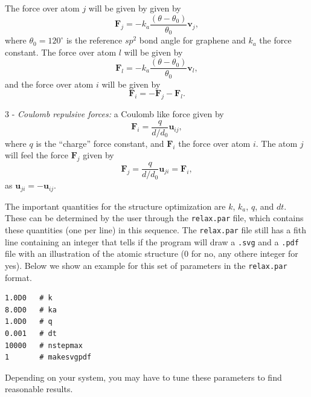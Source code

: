 \documentclass{scrreprt}
\begin{document}
The force over atom $j$ will be given by  given by
\begin{equation}
\mathbf{F}_j=-k_a\frac{(\theta-\theta_0)}{\theta_0}\mathbf{v}_j,
\end{equation}
where $\theta_0=120^\circ$ is the reference $sp^2$ bond angle for graphene and $k_a$ the force constant. The force over atom $l$ will be given by
\begin{equation}
\mathbf{F}_l=-k_a\frac{(\theta-\theta_0)}{\theta_0}\mathbf{v}_l,
\end{equation}
and the force over atom $i$ will be given by
\begin{equation}
\mathbf{F}_i=-\mathbf{F}_j-\mathbf{F}_l.
\end{equation}


3 - \emph{Coulomb repulsive forces:} a Coulomb like force given by
\begin{equation}
\mathbf{F}_i=\frac{q}{d/d_0}\mathbf{u}_{ij},
\end{equation}
where $q$ is the ``charge'' force constant, and $\mathbf{F}_i$ the force over atom $i$. The atom $j$ will feel the force $\mathbf{F}_j$ given by
\begin{equation}
\mathbf{F}_j=\frac{q}{d/d_0}\mathbf{u}_{ji}=\mathbf{F}_i,
\end{equation}
as $\mathbf{u}_{ji}=-\mathbf{u}_{ij}$.

The important quantities for the structure optimization are $k$, $k_a$, $q$, and $dt$. These can be determined by the user through the \verb-relax.par- file, which contains these quantities (one per line) in this sequence. The \verb-relax.par- file still has a fith line containing an integer that tells if the program will draw a \verb-.svg- and a \verb-.pdf- file with an illustration of the atomic structure (0 for no, any othere integer for yes). Below we show an example for this set of parameters in the \verb-relax.par- format.
\begin{verbatim}
1.0D0   # k
8.0D0   # ka
1.0D0   # q
0.001   # dt
10000   # nstepmax
1       # makesvgpdf 
\end{verbatim}
Depending on your system, you may have to tune these parameters to find reasonable results.
\end{document}
